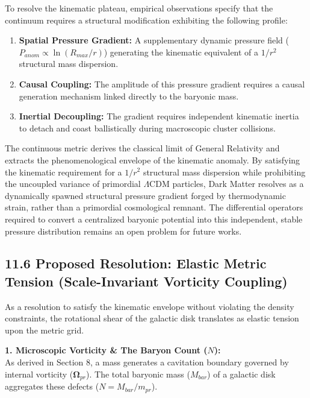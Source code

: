 To resolve the kinematic plateau, empirical observations specify that the continuum requires a structural modification exhibiting the following profile: 
\begin{enumerate}
    \item \textbf{Spatial Pressure Gradient:} A supplementary dynamic pressure field ($P_{anom} \propto \ln(R_{max}/r)$) generating the kinematic equivalent of a $1/r^2$ structural mass dispersion. 
    \item \textbf{Causal Coupling:} The amplitude of this pressure gradient requires a causal generation mechanism linked directly to the baryonic mass. 
    \item \textbf{Inertial Decoupling:} The gradient requires independent kinematic inertia to detach and coast ballistically during macroscopic cluster collisions. 
\end{enumerate}

The continuous metric derives the classical limit of General Relativity and extracts the phenomenological envelope of the kinematic anomaly. By satisfying the kinematic requirement for a $1/r^2$ structural mass dispersion while prohibiting the uncoupled variance of primordial $\Lambda$CDM particles, Dark Matter resolves as a dynamically spawned structural pressure gradient forged by thermodynamic strain, rather than a primordial cosmological remnant. The differential operators required to convert a centralized baryonic potential into this independent, stable pressure distribution remains an open problem for future works. 
\subsection*{11.6 Proposed Resolution: Elastic Metric Tension (Scale-Invariant Vorticity Coupling)} 
\label{sec:deriv_admittance_depletion}

As a resolution to satisfy the kinematic envelope without violating the density constraints, the rotational shear of the galactic disk translates as elastic tension upon the metric grid. 

\textbf{1. Microscopic Vorticity \& The Baryon Count ($N$):} \\
As derived in Section 8, a mass generates a cavitation boundary governed by internal vorticity ($\boldsymbol{\Omega}_{pr}$). The total baryonic mass ($M_{bar}$) of a galactic disk aggregates these defects ($N = M_{bar} / m_{pr}$).

